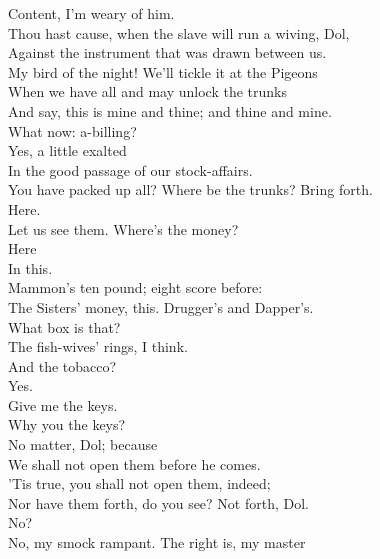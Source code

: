 \documentclass[a4paper,oneside,12pt]{memoir}
\begin{document}
\begin{drama*}
\dolspeaks {} Content, I'm weary of him.\\
\subtlespeaks Thou hast cause, when the slave will run a wiving, Dol,\\
Against the instrument that was drawn between us.\\
My bird of the night! We'll tickle it at the Pigeons\\
When we have all and may unlock the trunks\\
And say, this is mine and thine; and thine and mine.\\
\facespeaks What now: a-billing?\\
\subtlespeaks {} Yes, a little exalted\\
In the good passage of our stock-affairs.\\
\facespeaks You have packed up all? Where be the trunks? Bring forth.\\
\subtlespeaks Here.\\
\facespeaks {} Let us see them. Where's the money?\\
\subtlespeaks {} Here\\
In this.\\
\facespeaks {} Mammon's ten pound; eight score before:\\
The Sisters' money, this. Drugger's and Dapper's.\\
What box is that?\\
\subtlespeaks {} The fish-wives' rings, I think.\\
And the tobacco?\\
\subtlespeaks {} Yes.\\
\facespeaks {} Give me the keys.\\
\dolspeaks Why you the keys?\\
\subtlespeaks {} No matter, Dol; because\\
We shall not open them before he comes.\\
\facespeaks 'Tis true, you shall not open them, indeed;\\
Nor have them forth, do you see? Not forth, Dol.\\
\dolspeaks No?\\
\facespeaks {} No, my smock rampant. The right is, my master\\

\end{drama*}
\end{document}
